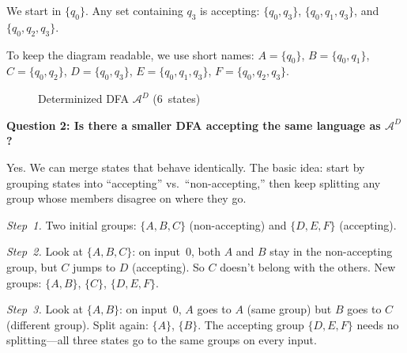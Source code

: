 \documentclass{article}
\theoremstyle{theorem}
\theoremstyle{definition}
\theoremstyle{remark}
\begin{document}
We start in $\{q_0\}$. Any set containing $q_3$ is accepting: $\{q_0,q_3\}$, $\{q_0,q_1,q_3\}$, and $\{q_0,q_2,q_3\}$.

To keep the diagram readable, we use short names: $A = \{q_0\}$, $B = \{q_0,q_1\}$, $C = \{q_0,q_2\}$, $D = \{q_0,q_3\}$, $E = \{q_0,q_1,q_3\}$, $F = \{q_0,q_2,q_3\}$.

\begin{figure}[H]
  \centering
  \caption{Determinized DFA $\mathcal{A}^D$ (6~states)}
\end{figure}

\textbf{Question 2: Is there a smaller DFA accepting the same language as $\mathcal{A}^D$?}

Yes. We can merge states that behave identically. The basic idea: start by grouping states into ``accepting'' vs.\ ``non-accepting,'' then keep splitting any group whose members disagree on where they go.

\emph{Step~1.} Two initial groups: $\{A, B, C\}$ (non-accepting) and $\{D, E, F\}$ (accepting).

\emph{Step~2.} Look at $\{A, B, C\}$: on input~$0$, both $A$ and $B$ stay in the non-accepting group, but $C$ jumps to $D$ (accepting). So $C$ doesn't belong with the others. New groups: $\{A, B\}$, $\{C\}$, $\{D, E, F\}$.

\emph{Step~3.} Look at $\{A, B\}$: on input~$0$, $A$ goes to $A$ (same group) but $B$ goes to $C$ (different group). Split again: $\{A\}$, $\{B\}$. The accepting group $\{D, E, F\}$ needs no splitting---all three states go to the same groups on every input.
\end{document}
